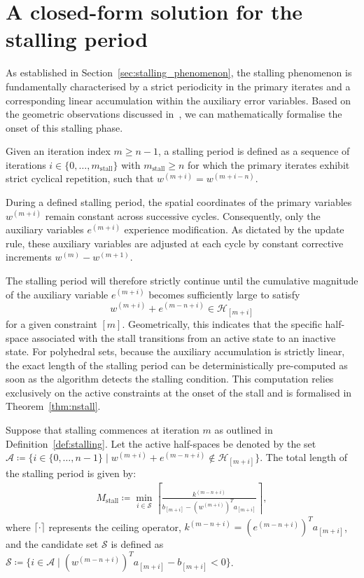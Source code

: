 \section{A closed-form solution for the stalling period} \label{sec:closed_form_solution}

As established in Section~\ref{sec:stalling_phenomenon}, the stalling phenomenon is fundamentally characterised by a strict periodicity in the primary iterates and a corresponding linear accumulation within the auxiliary error variables. Based on the geometric observations discussed in~\cite{DYKSTRASTALLING}, we can mathematically formalise the onset of this stalling phase.

\begin{definition}[Stalling]\label{def:stalling}
Given an iteration index $m \geq n-1$, a stalling period is defined as a sequence of iterations $i \in \{0,\dots,m_\text{stall}\}$ with $m_\text{stall} \geq n$ for which the primary iterates exhibit strict cyclical repetition, such that $w^{(m+i)} = w^{(m+i-n)}$.
\end{definition}

During a defined stalling period, the spatial coordinates of the primary variables $w^{(m+i)}$ remain constant across successive cycles. Consequently, only the auxiliary variables $e^{(m+i)}$ experience modification. As dictated by the update rule, these auxiliary variables are adjusted at each cycle by constant corrective increments $w^{(m)} - w^{(m+1)}$. 

The stalling period will therefore strictly continue until the cumulative magnitude of the auxiliary variable $e^{(m+i)}$ becomes sufficiently large to satisfy \[w^{(m+i)} + e^{(m-n+i)} \in \mathcal{H}_{[m+i]}\] for a given constraint $[m]$. Geometrically, this indicates that the specific half-space associated with the stall transitions from an active state to an inactive state. For polyhedral sets, because the auxiliary accumulation is strictly linear, the exact length of the stalling period can be deterministically pre-computed as soon as the algorithm detects the stalling condition. This computation relies exclusively on the active constraints at the onset of the stall and is formalised in Theorem~\ref{thm:nstall}.

\begin{theorem}\label{thm:nstall}
Suppose that stalling commences at iteration $m$ as outlined in Definition~\ref{def:stalling}. Let the active half-spaces be denoted by the set $\mathcal{A} \coloneqq \{i \in \{0,\dots,n-1\} \mid w^{(m+i)} + e^{(m-n+i)} \notin \mathcal{H}_{[m+i]}\}$. The total length of the stalling period is given by:
\begin{align}\label{eq:nstall}
    M_\mathrm{stall} \coloneqq \min_{i \in \mathcal{S}} \left\lceil \frac{k^{(m-n+i)}}{b_{[m+i]} - (w^{(m+i)})^T a_{[m+i]}}\right\rceil,
\end{align}
where $\lceil \cdot \rceil$ represents the ceiling operator, $k^{(m-n+i)} = (e^{(m-n+i)})^T a_{[m+i]}$, and the candidate set $\mathcal{S}$ is defined as $\mathcal{S} \coloneqq \{i \in \mathcal{A} \mid (w^{(m-n+i)})^T a_{[m+i]} - b_{[m+i]} < 0\}$.
\end{theorem}

